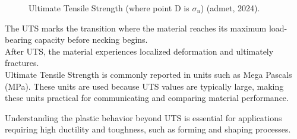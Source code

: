 \documentclass{article}
\begin{document}
{\begin{center}
\begin{minipage}{0.47\textwidth}
\begin{figure}[H]
            \caption{Ultimate Tensile Strength (where point D is $\sigma_{u}$) (admet, 2024).}
            \label{fig:uts}
        \end{figure}
    \end{minipage}\hfil
    \begin{minipage}{0.45\textwidth}
        The UTS marks the transition where the material reaches its maximum load-bearing capacity before necking begins.\\[8pt] 
        After UTS, the material experiences localized deformation and ultimately fractures.\\[8pt]
        Ultimate Tensile Strength is commonly reported in units such as  Mega Pascals (MPa). These units are used because UTS values are typically large, making these units practical for communicating and comparing material performance.    
    \end{minipage}
\end{center}
Understanding the plastic behavior beyond UTS is essential for applications requiring high ductility and toughness, such as forming and shaping processes.


\newpage

}
\end{document}
